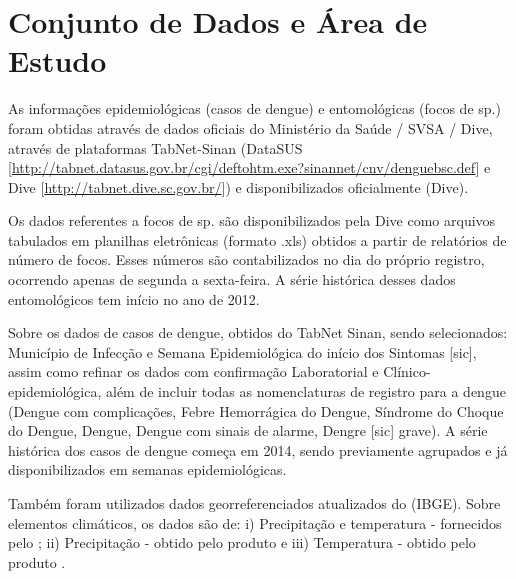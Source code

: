 \section{Conjunto de Dados e Área de Estudo}

\indent As informações epidemiológicas (casos de dengue) e entomológicas (focos de  sp.) foram obtidas através de dados oficiais do Ministério da Saúde / \acrfull{SVSA} / \acrfull{Dive}, através de plataformas  TabNet-\acrshort{Sinan} (\acrshort{DataSUS} [\url{http://tabnet.datasus.gov.br/cgi/deftohtm.exe?sinannet/cnv/denguebsc.def}] e \acrshort{Dive} [\url{http://tabnet.dive.sc.gov.br/}]) e disponibilizados oficialmente (\acrshort{Dive}).

\indent Os dados referentes a focos de  sp. são disponibilizados pela \acrshort{Dive} como arquivos tabulados em planilhas eletrônicas (formato .xls) obtidos a partir de relatórios de número de focos. Esses números são contabilizados no dia do próprio registro, ocorrendo apenas de segunda a sexta-feira. A série histórica desses dados entomológicos tem início no ano de 2012.

\indent Sobre os dados de casos de dengue, obtidos  do TabNet \acrshort{Sinan}, sendo selecionados: Município de Infecção e Semana Epidemiológica do início dos Sintomas [sic], assim como refinar os dados com confirmação Laboratorial e Clínico-epidemiológica, além de incluir todas as nomenclaturas de registro para a dengue (Dengue com complicações, Febre Hemorrágica do Dengue, Síndrome do Choque do Dengue, Dengue, Dengue com sinais de alarme, Dengre [sic] grave).  A série histórica dos casos de dengue começa em 2014, sendo previamente agrupados e já disponibilizados em semanas epidemiológicas.

\indent Também foram utilizados dados georreferenciados atualizados do (\acrfull{IBGE}). Sobre elementos climáticos, os dados são de:
i) Precipitação e temperatura - fornecidos pelo ; ii) Precipitação - obtido pelo produto  e iii) Temperatura - obtido pelo produto .


